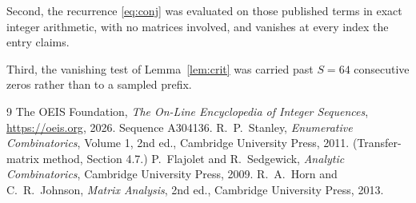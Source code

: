 \documentclass[11pt,a4paper]{article}
\theoremstyle{plain}
\theoremstyle{definition}
\begin{document}
Second, the recurrence \eqref{eq:conj} was evaluated on those published terms in exact
integer arithmetic, with no matrices involved, and vanishes at every index the entry claims.

Third, the vanishing test of Lemma~\ref{lem:crit} was carried past $S=64$ consecutive
zeros rather than to a sampled prefix.

\begin{thebibliography}{9}
 The OEIS Foundation, \emph{The On-Line Encyclopedia of Integer
Sequences}, \url{https://oeis.org}, 2026. Sequence A304136.
 R.~P.~Stanley, \emph{Enumerative Combinatorics}, Volume 1, 2nd ed.,
Cambridge University Press, 2011. (Transfer-matrix method, Section 4.7.)
 P.~Flajolet and R.~Sedgewick, \emph{Analytic Combinatorics}, Cambridge
University Press, 2009.
 R.~A.~Horn and C.~R.~Johnson, \emph{Matrix Analysis}, 2nd ed., Cambridge
University Press, 2013.
\end{thebibliography}
\end{document}
